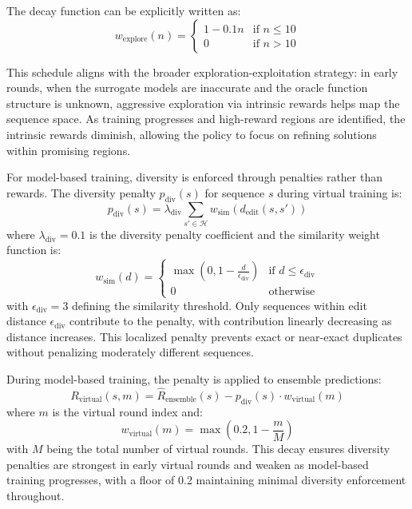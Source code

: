 \documentclass[conference]{IEEEtran}
\begin{document}
The decay function can be explicitly written as:
%
\begin{equation}
w_{\text{explore}}(n) = \begin{cases}
1 - 0.1n & \text{if } n \leq 10 \\
0 & \text{if } n > 10
\end{cases}
\end{equation}

This schedule aligns with the broader exploration-exploitation strategy: in early rounds, when the surrogate models are inaccurate and the oracle function structure is unknown, aggressive exploration via intrinsic rewards helps map the sequence space. As training progresses and high-reward regions are identified, the intrinsic rewards diminish, allowing the policy to focus on refining solutions within promising regions.

For model-based training, diversity is enforced through penalties rather than rewards. The diversity penalty $p_{\text{div}}(s)$ for sequence $s$ during virtual training is:
%
\begin{equation}
p_{\text{div}}(s) = \lambda_{\text{div}} \sum_{s' \in \mathcal{H}} w_{\text{sim}}(d_{\text{edit}}(s, s'))
\end{equation}
%
where $\lambda_{\text{div}} = 0.1$ is the diversity penalty coefficient and the similarity weight function is:
%
\begin{equation}
w_{\text{sim}}(d) = \begin{cases}
\max\left(0, 1 - \frac{d}{\epsilon_{\text{div}}}\right) & \text{if } d \leq \epsilon_{\text{div}} \\
0 & \text{otherwise}
\end{cases}
\end{equation}
%
with $\epsilon_{\text{div}} = 3$ defining the similarity threshold. Only sequences within edit distance $\epsilon_{\text{div}}$ contribute to the penalty, with contribution linearly decreasing as distance increases. This localized penalty prevents exact or near-exact duplicates without penalizing moderately different sequences.

During model-based training, the penalty is applied to ensemble predictions:
%
\begin{equation}
R_{\text{virtual}}(s, m) = \hat{R}_{\text{ensemble}}(s) - p_{\text{div}}(s) \cdot w_{\text{virtual}}(m)
\end{equation}
%
where $m$ is the virtual round index and:
%
\begin{equation}
w_{\text{virtual}}(m) = \max\left(0.2, 1 - \frac{m}{M}\right)
\end{equation}
%
with $M$ being the total number of virtual rounds. This decay ensures diversity penalties are strongest in early virtual rounds and weaken as model-based training progresses, with a floor of 0.2 maintaining minimal diversity enforcement throughout.
\end{document}
